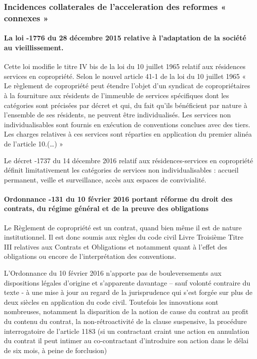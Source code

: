 		\subsubsection{Incidences collaterales de l’acceleration des reformes « connexes »}
		
			\paragraph{La loi -1776 du 28 décembre 2015 relative à l'adaptation de la société au vieillissement.}
			
			Cette loi modifie le titre IV bis de la loi du 10 juillet 1965 relatif aux résidences services en copropriété.
			Selon le nouvel article 41-1 de la loi du 10 juillet 1965 « Le règlement de copropriété peut étendre l'objet d'un syndicat de copropriétaires à la fourniture aux résidents de l'immeuble de services spécifiques dont les catégories sont précisées par décret et qui, du fait qu'ils bénéficient par nature à l'ensemble de ses résidents, ne peuvent être individualisés. Les services non individualisables sont fournis en exécution de conventions conclues avec des tiers. Les charges relatives à ces services sont réparties en application du premier alinéa de l'article 10.(…) »
			
			Le décret -1737 du 14 décembre 2016 relatif aux résidences-services en copropriété définit limitativement les catégories de services non individualisables : accueil permanent, veille et surveillance, accès aux espaces de convivialité.
			
			\paragraph{Ordonnance -131 du 10 février 2016 portant réforme du droit des contrats, du régime général et de la preuve des obligations}
			
			Le Règlement de copropriété est un contrat, quand bien même il est de nature institutionnel. Il est donc soumis aux règles du code civil Livre Troisième Titre III relatives aux Contrats et Obligations et notamment quant à l’effet des obligations ou encore de l’interprétation des conventions.
			
			L’Ordonnance du 10 février 2016 n’apporte pas de bouleversements aux dispositions légales d’origine et s’apparente davantage – sauf volonté contraire du texte - à une mise à jour au regard de la jurisprudence qui s’est forgée sur plus de deux siècles en application du code civil. Toutefois les innovations sont nombreuses, notamment la disparition de la notion de cause du contrat au profit du contenu du contrat, la non-rétroactivité de la clause suspensive, la procédure interrogatoire de l’article 1183 (si un contractant craint une action en annulation du contrat il peut intimer au co-contractant d’introduire son action dans le délai de six mois, à peine de forclusion)
		
